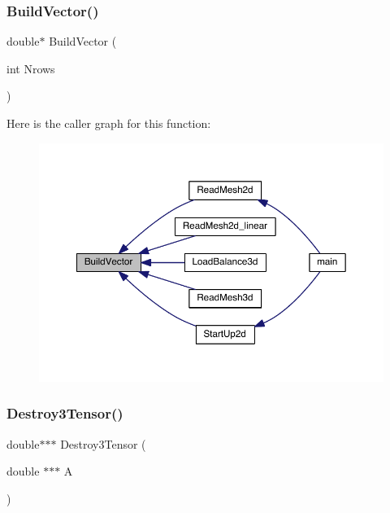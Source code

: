 \subsubsection{\texorpdfstring{Build\+Vector()}{BuildVector()}}
{\footnotesize\ttfamily double$\ast$ Build\+Vector (\begin{DoxyParamCaption}\item[{int}]{Nrows }\end{DoxyParamCaption})}

Here is the caller graph for this function\+:\nopagebreak
\begin{figure}[H]
\begin{center}
\leavevmode
\includegraphics[width=350pt]{a00602_a990278305dbeaf8e4441cf4146bfdc62_icgraph}
\end{center}
\end{figure}
\mbox{\label{a00602_a44d9724ffbc5b6937b622948003b9237}} 
\subsubsection{\texorpdfstring{Destroy3\+Tensor()}{Destroy3Tensor()}}
{\footnotesize\ttfamily double$\ast$$\ast$$\ast$ Destroy3\+Tensor (\begin{DoxyParamCaption}\item[{double $\ast$$\ast$$\ast$}]{A }\end{DoxyParamCaption})}

\mbox{\label{a00602_a622db7bf01e187334349001f44f29b8a}} 
